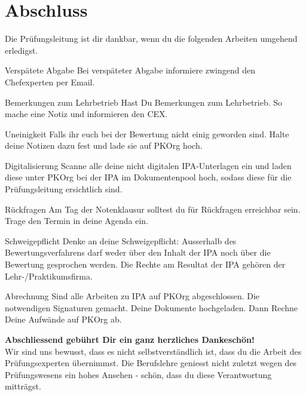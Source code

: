 \section{Abschluss}
Die Prüfungsleitung ist dir dankbar, wenn du die folgenden Arbeiten umgehend erledigst.

\begin{taskitemwithoutcomment}{Verspätete Abgabe}
  Bei verspäteter Abgabe informiere zwingend den Chefexperten per Email.
\end{taskitemwithoutcomment}\begin{taskitemwithoutcomment}{Bemerkungen zum Lehrbetrieb}
  Hast Du Bemerkungen zum Lehrbetrieb. So mache eine Notiz und informieren den CEX.
\end{taskitemwithoutcomment}
\begin{taskitemwithoutcomment}{Uneinigkeit}
  Falls ihr euch bei der Bewertung nicht einig geworden sind. Halte deine Notizen dazu fest und lade sie auf PKOrg hoch.
\end{taskitemwithoutcomment}
\begin{taskitemwithoutcomment}{Digitalisierung}
  Scanne alle deine nicht digitalen IPA-Unterlagen ein und laden diese unter PKOrg bei der IPA im Dokumentenpool hoch, sodass diese für die Prüfungsleitung ersichtlich sind.
\end{taskitemwithoutcomment}
\begin{taskitemwithoutcomment}{Rückfragen}
  Am Tag der Notenklausur solltest du für Rückfragen erreichbar sein. Trage den Termin in deine Agenda ein.
\end{taskitemwithoutcomment}
\begin{taskitemwithoutcomment}{Schweigepflicht}
  Denke an deine Schweigepflicht: Ausserhalb des Bewertungsverfahrens darf weder über den Inhalt der IPA noch über die Bewertung gesprochen werden. Die Rechte am Resultat der IPA gehören der Lehr-/Praktikumsfirma.
\end{taskitemwithoutcomment}
\begin{taskitemwithoutcomment}{Abrechnung}
  Sind alle Arbeiten zu IPA auf PKOrg abgeschlossen. Die notwendigen Signaturen gemacht. Deine Dokumente hochgeladen. Dann Rechne Deine Aufwände auf PKOrg ab.
\end{taskitemwithoutcomment}

\vspace*{2cm}

\textbf{Abschliessend gebührt Dir ein ganz herzliches Dankeschön!}\\Wir sind uns bewusst, dass es nicht selbstverständlich ist, dass du die Arbeit des Prüfungsexperten übernimmst. Die Berufslehre geniesst nicht zuletzt wegen des Prüfungswesens ein hohes Ansehen - schön, dass du diese Verantwortung mitträgst.
